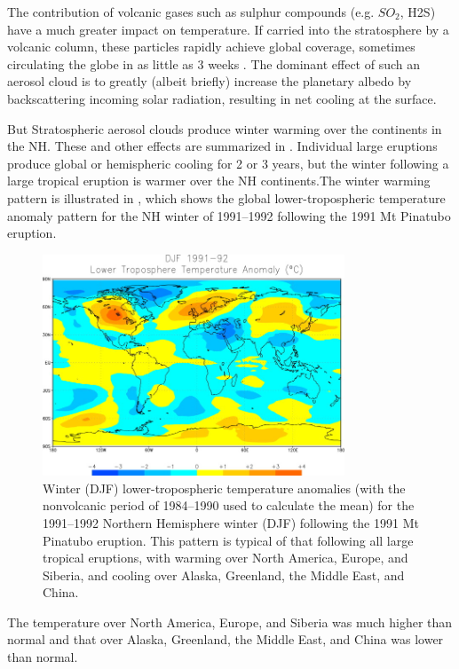 \documentclass{apmcmthesis}
\begin{document}
The contribution of volcanic gases such as sulphur compounds (e.g. $SO_2$, H2S) have a much greater impact on temperature.  If carried into the stratosphere by a volcanic column, these particles rapidly achieve global coverage, sometimes circulating the globe in as little as 3 weeks \cite{23}. The dominant effect of such an aerosol cloud is to greatly (albeit briefly) increase the planetary albedo by backscattering incoming solar radiation, resulting in net cooling at the surface.

But Stratospheric aerosol clouds produce winter warming over the continents in the NH. These and other effects are summarized in \cite{table_vol}. 
Individual large eruptions produce global or hemispheric cooling for 2 or 3 years, but the winter following a large tropical eruption is warmer over the NH continents.The winter warming pattern is illustrated in \cite{vol2}, which shows the global lower-tropospheric temperature anomaly pattern for the NH winter of 1991–1992 following the 1991 Mt Pinatubo eruption.

\begin{figure} 
    \centering
    \includegraphics[width=9cm]{APMCMThesis/figures/vol2.png}
    \caption{Winter (DJF) lower-tropospheric temperature anomalies (with the nonvolcanic period of 1984–1990 used to calculate the mean) for the 1991–1992 Northern Hemisphere winter (DJF) following the 1991 Mt Pinatubo eruption. This pattern is typical of that following all large tropical eruptions, with warming over North America, Europe, and Siberia, and cooling over Alaska, Greenland, the Middle East, and China.\cite{bib:two}}
\label{vol2}
\end{figure}

The temperature over North America, Europe, and Siberia was much higher than normal and that over Alaska, Greenland, the Middle East, and China was lower than normal.
\end{document}
